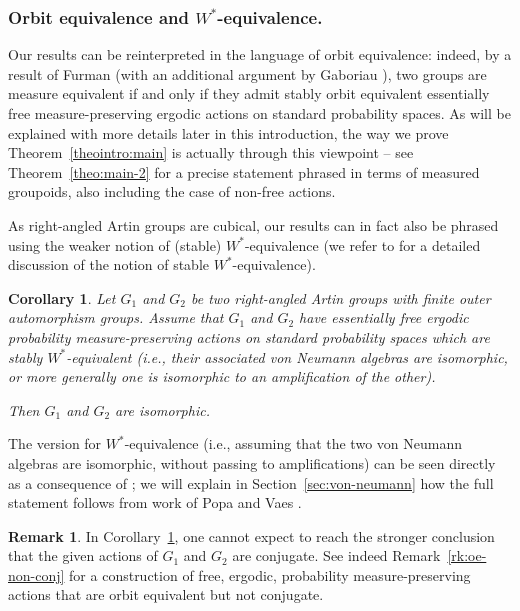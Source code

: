 \documentclass[11pt]{article}
\newcommand{\ie}{i.e.,\xspace}
\numberwithin{equation}{section}
\theoremstyle{plain}
\newtheorem{corintro}[theointro]{Corollary}
\theoremstyle{definition}
\newtheorem*{rk*}{Remark}
\begin{document}
\subsubsection*{Orbit equivalence and $W^*$-equivalence.} Our results can be reinterpreted in the language of orbit equivalence: indeed, by a result of Furman \cite{Fur2} (with an additional argument by Gaboriau \cite[Th.\,2.3]{Gab2}), two groups are measure equivalent if and only if they admit stably orbit equivalent essentially free measure-preserving ergodic actions on standard probability spaces. As will be explained with more details later in this introduction, the way we prove Theorem~\ref{theointro:main} is actually through this viewpoint -- see Theorem~\ref{theo:main-2} for a precise statement phrased in terms of measured groupoids, also including the case of non-free actions.

As right-angled Artin groups are cubical, our results can in fact also be phrased using the weaker notion of (stable) $W^*$-equivalence (we refer to \cite[\S 6.2]{PV} for a detailed discussion of the notion of stable $W^*$-equivalence).

\begin{corintro}\label{corintro:von-neumann}
Let $G_1$ and $G_2$ be two right-angled Artin groups with finite outer automorphism groups. Assume that $G_1$ and $G_2$ have essentially free ergodic probability measure-preserving actions on standard probability spaces which are stably $W^*$\nobreakdash-equi\-valent (\ie their associated von Neumann algebras are isomorphic, or more generally one is isomorphic to an amplification of the other).

Then $G_1$ and $G_2$ are isomorphic.
\end{corintro}

The version for $W^*$-equivalence (\ie assuming that the two von Neumann algebras are isomorphic, without passing to amplifications) can be seen directly as a consequence of \cite[Cor.\,4.2]{HHL}; we will explain in Section~\ref{sec:von-neumann} how the full statement follows from work of Popa and Vaes \cite{PV1}.

\begin{rk*}
In Corollary~\ref{corintro:von-neumann}, one cannot expect to reach the stronger conclusion that the given actions of $G_1$ and $G_2$ are conjugate. See indeed Remark~\ref{rk:oe-non-conj} for a construction of free, ergodic, probability measure-preserving actions that are orbit equivalent but not conjugate.
\end{rk*}
\end{document}

